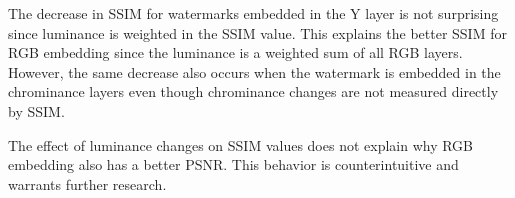 The decrease in SSIM for watermarks embedded in the Y layer is not surprising since luminance is weighted in the SSIM value.
This explains the better SSIM for RGB embedding since the luminance is a weighted sum of all RGB layers.
However, the same decrease also occurs when the watermark is embedded in the chrominance layers even though chrominance changes are not measured directly by SSIM.

The effect of luminance changes on SSIM values does not explain why RGB embedding also has a better PSNR.
This behavior is counterintuitive and warrants further research.

